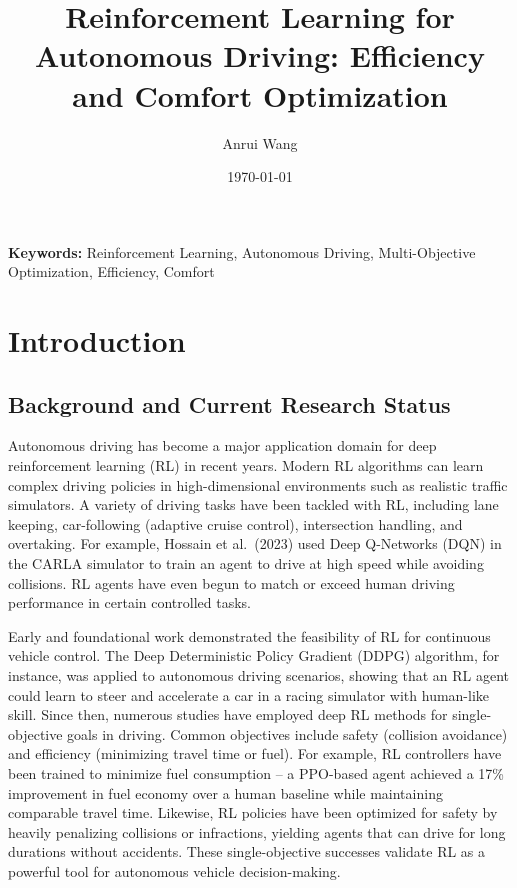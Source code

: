 \documentclass[12pt,a4paper]{article}
\title{\Large Reinforcement Learning for Autonomous Driving: Efficiency and Comfort Optimization}
\author{Anrui Wang}
\date{\today}
\begin{document}
\maketitle

\begin{abstract}
    
\end{abstract}

\textbf{Keywords:} Reinforcement Learning, Autonomous Driving, Multi-Objective Optimization, Efficiency, Comfort

\section{Introduction}

\subsection{Background and Current Research Status}
Autonomous driving has become a major application domain for deep reinforcement learning (RL) in recent years. Modern RL algorithms can learn complex driving policies in high-dimensional environments such as realistic traffic simulators\cite{hossain2023}. A variety of driving tasks have been tackled with RL, including lane keeping, car-following (adaptive cruise control), intersection handling, and overtaking. For example, Hossain et al.~(2023) used Deep Q-Networks (DQN) in the CARLA simulator to train an agent to drive at high speed while avoiding collisions\cite{hossain2023}. RL agents have even begun to match or exceed human driving performance in certain controlled tasks\cite{jin2025}.

Early and foundational work demonstrated the feasibility of RL for continuous vehicle control. The Deep Deterministic Policy Gradient (DDPG) algorithm, for instance, was applied to autonomous driving scenarios, showing that an RL agent could learn to steer and accelerate a car in a racing simulator with human-like skill\cite{zhu2020}. Since then, numerous studies have employed deep RL methods for single-objective goals in driving. Common objectives include safety (collision avoidance) and efficiency (minimizing travel time or fuel). For example, RL controllers have been trained to minimize fuel consumption – a PPO-based agent achieved a 17\% improvement in fuel economy over a human baseline while maintaining comparable travel time\cite{zhu2021}. Likewise, RL policies have been optimized for safety by heavily penalizing collisions or infractions, yielding agents that can drive for long durations without accidents. These single-objective successes validate RL as a powerful tool for autonomous vehicle decision-making\cite{survey2023}.
\end{document}
